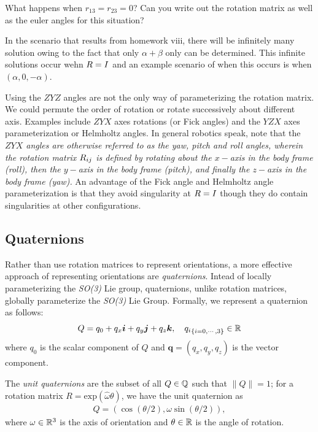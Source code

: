 \noindent 
\begin{homework}
	What happens when $r_{13} = r_{23} = 0$? Can you write out the rotation matrix as well as the euler angles for this situation?
\end{homework}

In the scenario that results from homework viii, there will be infinitely many solution owing to the fact that only $\alpha + \beta$ only can be determined. This infinite solutions occur wehn ${R} = I$ and an example scenario of when this occurs is when $(\alpha, 0, -\alpha)$.

Using the $ZYZ$ angles are not the only way of parameterizing the rotation matrix. We could permute the order of rotation or rotate successively about different axis. Examples include $ZYX$ axes rotations (or Fick angles) and the $YZX$ axes parameterization or Helmholtz angles. In general robotics speak, note that the \textit{$ZYX$  angles are otherwise referred to as the yaw, pitch and roll angles, wherein the rotation matrix ${R}_{ij}$ is defined by rotating about the $x-$axis in the body frame (roll), then the $y-$axis in the body frame (pitch), and finally the $z-$axis in the body frame (yaw). } An advantage of the Fick angle  and Helmholtz angle parameterization is that they avoid singularity at ${R} = I$ though they do contain singularities at other configurations.

\subsection{Quaternions}
\label{chap:rbd_quat}
%
Rather than use rotation matrices to represent orientations, a more effective approach of representing orientations are \textit{quaternions}. Intead of locally parameterizing the \textit{SO(3)} Lie group, quaternions, unlike rotation matrices, globally parameterize the \textit{SO(3)} Lie Group. Formally, we represent a quaternion as follows:
%
\begin{align}
	Q = q_0 + q_x \bm{i} + q_y \bm{j} + q_z \bm{k} , \quad {q_i}_{\{i = 0, \cdots, 3\}} \in \mathbb{R}
\end{align}
%
where $q_0$ is the scalar component of $Q$ and $\bm{q} = (q_x, q_y, q_z)$ is the vector component.

The \textit{unit quaternions} are the subset of all $Q \in \mathbb{Q}$ such that $\|Q\| = 1$; for a rotation matrix $R = \text{exp}(\hat{\omega}\theta)$, we have the unit quaternion as 
%
\begin{align}
	Q = \left(\cos(\theta/2), \omega \sin \left(\theta/2\right) \right),
\end{align}
%
where $\omega \in \mathbb{R}^3$ is the axis of orientation and $\theta \in \mathbb{R}$ is the angle of rotation.

